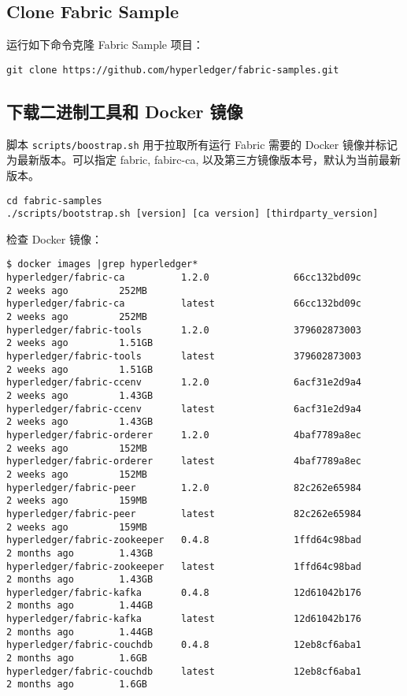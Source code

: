 \documentclass[11pt]{article}
\begin{document}
\subsection{Clone Fabric Sample}
\label{sec-3-1}
运行如下命令克隆 Fabric Sample 项目：
\begin{verbatim}
git clone https://github.com/hyperledger/fabric-samples.git
\end{verbatim}

\subsection{下载二进制工具和 Docker 镜像}
\label{sec-3-2}
脚本 \texttt{scripts/boostrap.sh} 用于拉取所有运行 Fabric 需要的 Docker 镜像并标记为最新版本。可以指定 fabric, fabirc-ca, 以及第三方镜像版本号，默认为当前最新版本。
\begin{verbatim}
cd fabric-samples
./scripts/bootstrap.sh [version] [ca version] [thirdparty_version]
\end{verbatim}

检查 Docker 镜像：
\begin{verbatim}
$ docker images |grep hyperledger*
hyperledger/fabric-ca          1.2.0               66cc132bd09c        2 weeks ago         252MB
hyperledger/fabric-ca          latest              66cc132bd09c        2 weeks ago         252MB
hyperledger/fabric-tools       1.2.0               379602873003        2 weeks ago         1.51GB
hyperledger/fabric-tools       latest              379602873003        2 weeks ago         1.51GB
hyperledger/fabric-ccenv       1.2.0               6acf31e2d9a4        2 weeks ago         1.43GB
hyperledger/fabric-ccenv       latest              6acf31e2d9a4        2 weeks ago         1.43GB
hyperledger/fabric-orderer     1.2.0               4baf7789a8ec        2 weeks ago         152MB
hyperledger/fabric-orderer     latest              4baf7789a8ec        2 weeks ago         152MB
hyperledger/fabric-peer        1.2.0               82c262e65984        2 weeks ago         159MB
hyperledger/fabric-peer        latest              82c262e65984        2 weeks ago         159MB
hyperledger/fabric-zookeeper   0.4.8               1ffd64c98bad        2 months ago        1.43GB
hyperledger/fabric-zookeeper   latest              1ffd64c98bad        2 months ago        1.43GB
hyperledger/fabric-kafka       0.4.8               12d61042b176        2 months ago        1.44GB
hyperledger/fabric-kafka       latest              12d61042b176        2 months ago        1.44GB
hyperledger/fabric-couchdb     0.4.8               12eb8cf6aba1        2 months ago        1.6GB
hyperledger/fabric-couchdb     latest              12eb8cf6aba1        2 months ago        1.6GB
\end{verbatim}
\end{document}
